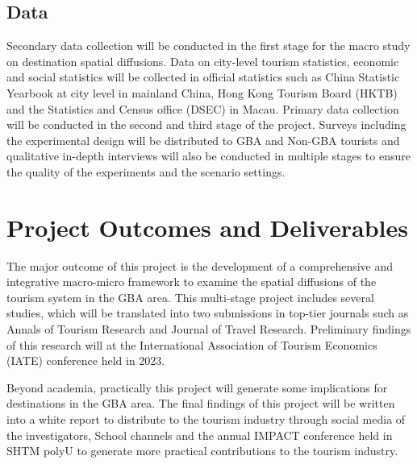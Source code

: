 \documentclass[11pt,a4paper]{amsart}
\theoremstyle{plain}
\theoremstyle{definition}
\begin{document}
\subsection{Data}\hfill\par 
\noindent Secondary data collection will be conducted in the first stage for the macro study on destination spatial diffusions. Data on city-level tourism statistics, economic and social statistics will be collected in official statistics such as China Statistic Yearbook at city level in mainland China, Hong Kong Tourism Board (HKTB) and the Statistics and Census office (DSEC) in Macau.
Primary data collection will be conducted in the second and third stage of the project. Surveys including the experimental design will be distributed to GBA and Non-GBA tourists and qualitative in-depth interviews will also be conducted in multiple stages to ensure the quality of the experiments and the scenario settings.

\section{Project Outcomes and Deliverables}\hfill\par
\noindent The major outcome of this project is the development of a comprehensive and integrative macro-micro framework to examine the spatial diffusions of the tourism system in the GBA area. This multi-stage project includes several studies, which will be translated into two submissions in top-tier journals such as Annals of Tourism Research and Journal of Travel Research. Preliminary findings of this research will at the International Association of Tourism Economics (IATE) conference held in 2023.

\noindent Beyond academia, practically this project will generate some implications for destinations in the GBA area. The final findings of this project will be written into a white report to distribute to the tourism industry through social media of the investigators, School channels and the annual IMPACT conference held in SHTM polyU to generate more practical contributions to the tourism industry.  

\newpage
\end{document}
